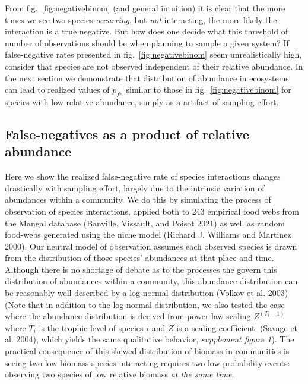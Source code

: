 \documentclass[11pt]{article}
\begin{document}
From fig.~\ref{fig:negativebinom} (and general intuition) it is clear
that the more times we see two species \emph{occurring}, but \emph{not}
interacting, the more likely the interaction is a true negative. But how
does one decide what this threshold of number of observations should be
when planning to sample a given system? If false-negative rates
presented in fig.~\ref{fig:negativebinom} seem unrealistically high,
consider that species are not observed independent of their relative
abundance. In the next section we demonstrate that distribution of
abundance in ecosystems can lead to realized values of \(p_{fn}\)
similar to those in fig.~\ref{fig:negativebinom} for species with low
relative abundance, simply as a artifact of sampling effort.

\hypertarget{false-negatives-as-a-product-of-relative-abundance}{%
\subsection{False-negatives as a product of relative
abundance}\label{false-negatives-as-a-product-of-relative-abundance}}

Here we show the realized false-negative rate of species interactions
changes drastically with sampling effort, largely due to the intrinsic
variation of abundances within a community. We do this by simulating the
process of observation of species interactions, applied both to 243
empirical food webs from the Mangal database (Banville, Vissault, and
Poisot 2021) as well as random food-webs generated using the niche model
(Richard J. Williams and Martinez 2000). Our neutral model of
observation assumes each observed species is drawn from the distribution
of those species' abundances at that place and time. Although there is
no shortage of debate as to the processes the govern this distribution
of abundances within a community, this abundance distribution can be
reasonably-well described by a log-normal distribution (Volkov et al.
2003) (Note that in addition to the log-normal distribution, we also
tested the case where the abundance distribution is derived from
power-law scaling \(Z^{(T_i-1)}\) where \(T_i\) is the trophic level of
species \(i\) and \(Z\) is a scaling coefficient. (Savage et al. 2004),
which yields the same qualitative behavior, \emph{supplement figure 1}).
The practical consequence of this skewed distribution of biomass in
communities is seeing two low biomass species interacting requires two
low probability events: observing two species of low relative biomass
\emph{at the same time}.
\end{document}
